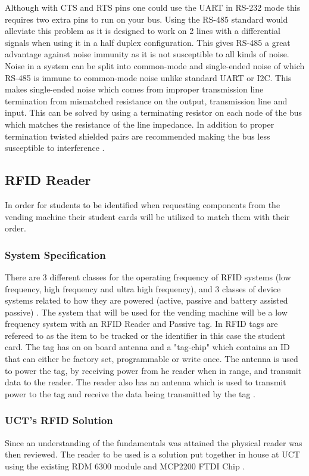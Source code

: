 \documentclass[a4paper,11pt]{article}
\numberwithin{figure}{subsection}
\begin{document}
Although with CTS and RTS pins one could use the UART in RS-232 mode this requires two extra pins to run on your bus. Using the RS-485 standard would alleviate this problem as it is designed to work on 2 lines with a differential signals when using it in a half duplex configuration. This gives RS-485 a great advantage against noise immunity as it is not susceptible to all kinds of noise. Noise in a system can be split into common-mode and single-ended noise of which RS-485 is immune to common-mode noise unlike standard UART or I2C. This makes single-ended noise which comes from improper transmission line termination from mismatched resistance on the output, transmission line and input. This can be solved by using a terminating resistor on each node of the bus which matches the resistance of the line impedance. In addition to proper termination twisted shielded pairs are recommended making the bus less susceptible to interference \cite{dif}. 

\subsection{RFID Reader}
In order for students to be identified when requesting components from the vending machine their student cards will be utilized to match them with their order. 

\subsubsection{System Specification}
There are 3 different classes for the operating frequency of RFID systems (low frequency, high frequency and ultra high frequency), and 3 classes of device systems related to how they are powered (active, passive and battery assisted passive) \cite{rfidsys}. The system that will be used for the vending machine will be a low frequency system with an RFID Reader and Passive tag. In RFID tags are refereed to as the item to be tracked or the identifier in this case the student card. The tag has on on board antenna and a "tag-chip" which contains an ID that can either be factory set, programmable or write once. The antenna is used to power the tag, by receiving power from he reader when in range, and transmit data to the reader. The reader also has an antenna which is used to transmit power to the tag and receive the data being transmitted by the tag \cite{rfidhow}.

\subsubsection{UCT's RFID Solution}
Since an understanding of the fundamentals was attained the physical reader was then reviewed. The reader to be used is a solution put together in house at UCT using the existing RDM 6300 module and MCP2200 FTDI Chip \cite{justin}.
\end{document}
